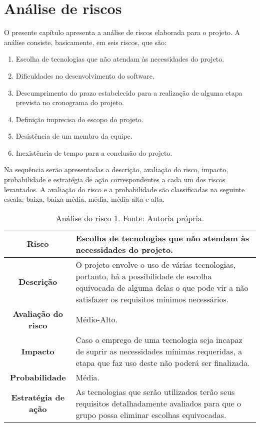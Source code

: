 \chapter{Análise de riscos}\label{cap:analiseriscos}

O presente capítulo apresenta a análise de riscos elaborada para o projeto. A análise consiste, basicamente, em seis riscos, que são:

\begin{enumerate}
\item Escolha de tecnologias que não atendam às necessidades do projeto.
\item Dificuldades no desenvolvimento do software.
\item Descumprimento do prazo estabelecido para a realização de alguma etapa prevista no cronograma do projeto.
\item Definição imprecisa do escopo do projeto.
\item Desistência de um membro da equipe.
\item Inexistência de tempo para a conclusão do projeto.
\end{enumerate}

Na sequência serão apresentadas a descrição, avaliação do risco, impacto, probabilidade e estratégia de ação correspondentes a cada um dos riscos levantados. A avaliação do risco e a probabilidade são classificadas na seguinte escala: baixa, baixa-média, média, média-alta e alta.

\begin{table}[h!]
\caption[Análise do risco 1]{Análise do risco 1. Fonte: Autoria própria.}
\begin{center}
\begin{tabular}{|c|p{11cm}|}
\hline
\textbf{Risco} & Escolha de tecnologias que não atendam às necessidades do projeto. \\
\hline
\textbf{Descrição} & O projeto envolve o uso de várias tecnologias, portanto, há a possibilidade de escolha equivocada de alguma delas o que pode vir a não satisfazer os requisitos mínimos necessários. \\
\hline
\textbf{Avaliação do risco} & Médio-Alto. \\
\hline
\textbf{Impacto} & Caso o emprego de uma tecnologia seja incapaz de suprir as necessidades mínimas requeridas, a etapa que faz uso deste não poderá ser finalizada. \\ 
\hline
\textbf{Probabilidade} & Média. \\
\hline
\textbf{Estratégia de ação} & As tecnologias que serão utilizados terão seus requisitos detalhadamente avaliados para que o grupo possa eliminar escolhas equivocadas.	\\
\hline
\end{tabular}%
\end{center}
\label{tab:risco1}
\end{table}

